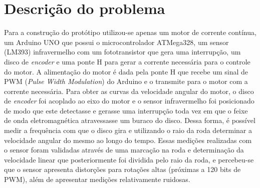 \documentclass{article}
\begin{document}
\section{Descrição do problema}
Para a construção do protótipo utilizou-se apenas um motor de corrente contínua, um Arduino UNO que possui o microcontrolador ATMega328, um sensor (LM393) infravermelho com um fototransistor que gera uma interrupção, um disco de \textit{encoder} e uma ponte H para gerar a corrente necessária para o controle do motor.
A alimentação do motor é dada pela ponte H que recebe um sinal de PWM (\textit{Pulse Width Modulation}) do Arduino e o transmite para o motor com a corrente necessária.
Para obter as curvas da velocidade angular do motor, o disco de \textit{encoder} foi acoplado ao eixo do motor e o sensor infravermelho foi posicionado de modo que este detectasse e gerasse uma interrupção toda vez em que o feixe de onda eletromagnética atravessasse um buraco do disco. Dessa forma, é possível medir a frequência com que o disco gira e utilizando o raio da roda determinar a velocidade angular do mesmo ao longo do tempo. Essas medições realizadas com o sensor foram validadas através de uma marcação na roda e determinação da velocidade linear que posteriormente foi dividida pelo raio da roda, e percebeu-se que o sensor apresenta distorções para rotações altas (próximas a 120 bits de PWM), além de apresentar medições relativamente ruidosas.
\end{document}
